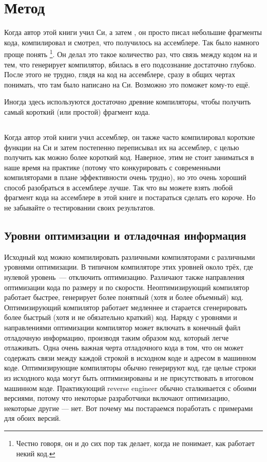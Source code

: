 \chapter{Метод}

Когда автор этой книги учил Си, а затем \Cpp, он просто писал небольшие фрагменты кода, компилировал и смотрел, что 
получилось на ассемблере. Так было намного проще понять%
\footnote{Честно говоря, он и до сих пор так делает, когда не понимает, как работает некий код.}.
Он делал это такое количество раз, что связь между кодом на \CCpp и тем, что генерирует компилятор, вбилась в его подсознание достаточно глубоко.
После этого не трудно, глядя на код на ассемблере, сразу в общих чертах понимать, что там было написано на Си. 
Возможно это поможет кому-то ещё.


Иногда здесь используются достаточно древние компиляторы, чтобы получить самый короткий (или простой) фрагмент кода.

\section*{\Exercises}

Когда автор этой книги учил ассемблер, он также часто компилировал короткие функции на Си и затем постепенно 
переписывал их на ассемблер, с целью получить как можно более короткий код.
Наверное, этим не стоит заниматься в наше время на практике (потому что конкурировать с современными
компиляторами в плане эффективности очень трудно), но это очень хороший способ разобраться в ассемблере
лучше.
Так что вы можете взять любой фрагмент кода на ассемблере в этой книге и постараться сделать его короче.
Но не забывайте о тестировании своих результатов.

\section*{Уровни оптимизации и отладочная информация}

Исходный код можно компилировать различными компиляторами с различными уровнями оптимизации.
В типичном компиляторе этих уровней около трёх, где нулевой уровень~--- отключить оптимизацию.
Различают также направления оптимизации кода по размеру и по скорости.
Неоптимизирующий компилятор работает быстрее, генерирует более понятный (хотя и более объемный) код.
Оптимизирующий компилятор работает медленнее и старается сгенерировать более быстрый (хотя и не обязательно краткий) код.
Наряду с уровнями и направлениями оптимизации компилятор может включать в конечный файл отладочную информацию,
производя таким образом код, который легче отлаживать.
Одна очень важная черта отладочного кода в том, что он может содержать
связи между каждой строкой в исходном коде и адресом в машинном коде.
Оптимизирующие компиляторы обычно генерируют код, где целые строки из исходного кода
могут быть оптимизированы и не присутствовать в итоговом машинном коде.
Практикующий reverse engineer обычно сталкивается с обоими версиями, потому что некоторые разработчики
включают оптимизацию, некоторые другие --- нет. Вот почему мы постараемся поработать с примерами для обоих версий.
